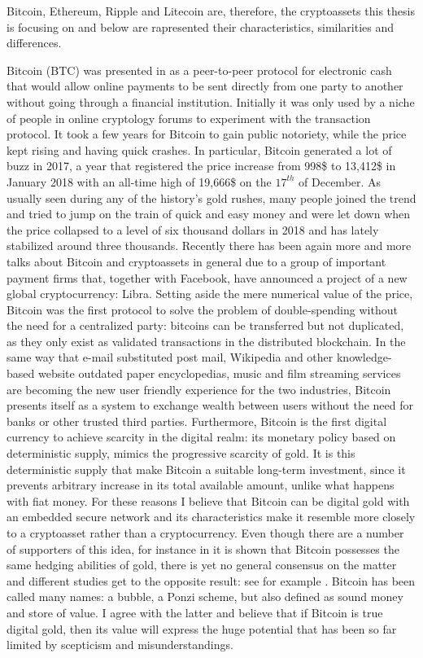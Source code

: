 Bitcoin, Ethereum, Ripple and Litecoin are, therefore, the cryptoassets this thesis is focusing on and below are rapresented their characteristics, similarities and differences.
\bigskip

Bitcoin (BTC) was presented in \citep{BTC2008} as a peer-to-peer protocol for electronic cash that would allow online payments to be sent directly from one party to another without going through a financial institution. Initially it was only used by a niche of people in online cryptology forums to experiment with the transaction protocol. It took a few years for Bitcoin to gain public notoriety, while the price kept rising and having quick crashes.
In particular, Bitcoin generated a lot of buzz in 2017, a year that registered the price increase from 998\$ to 13,412\$ in January 2018 with an all-time high of 19,666\$ on the $17^{th}$ of December. As usually seen during any of the history's gold rushes, many people joined the trend and tried to jump on the train of quick and easy money and were let down when the price collapsed to a level of six thousand dollars in 2018 and has lately stabilized around three thousands.
Recently there has been again more and more talks about Bitcoin and cryptoassets in general due to a group of important payment firms that, together with Facebook, have announced a project of a new global cryptocurrency: Libra. Setting aside the mere numerical value of the price, Bitcoin was the first protocol to solve the problem of double-spending without the need for a centralized party: bitcoins can be transferred but not duplicated, as they only exist as validated transactions in the distributed blockchain. In the same way that e-mail substituted post mail, Wikipedia and other knowledge-based website outdated paper encyclopedias, music and film streaming services are becoming the new user friendly experience for the two industries, Bitcoin presents itself as a system to exchange wealth between users without the need for banks or other trusted third parties.
Furthermore, Bitcoin is the first digital currency to achieve scarcity in the digital realm: its monetary policy based on deterministic supply, mimics the progressive scarcity of gold. It is this deterministic supply that make Bitcoin a suitable long-term investment, since it prevents arbitrary increase in its total available amount, unlike what happens with fiat money.
For these reasons I believe that Bitcoin can be digital gold with an embedded secure network and its characteristics make it resemble more closely to a cryptoasset rather than a cryptocurrency. Even though there are a number of supporters of this idea, for instance in \citep{digitalgold} it is shown that Bitcoin possesses the same hedging abilities of gold, there is yet no general consensus on the matter and different studies get to the opposite result: see for example \citep{klein}.
Bitcoin has been called many names: a bubble, a Ponzi scheme, but also defined as sound money and store of value. I agree with the latter and believe that if Bitcoin is true digital gold, then its value will express the huge potential that has been so far limited by scepticism and misunderstandings.

